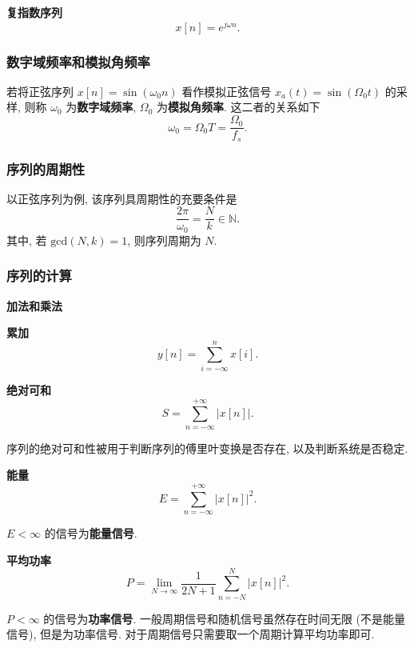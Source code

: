 \textbf{复指数序列}
\begin{equation}
    x[n]=e^{j\omega n}.
\end{equation}

\subsubsection{数字域频率和模拟角频率}
若将正弦序列 $x[n]=\sin(\omega_0 n)$ 看作模拟正弦信号 $x_a(t)=\sin(\Omega_0 t)$ 的采样, 则称 $\omega_0$ 为\textbf{数字域频率}, $\Omega_0$ 为\textbf{模拟角频率}. 这二者的关系如下
\begin{equation}
    \omega_0=\Omega_0T=\frac{\Omega_0}{f_s}.
\end{equation}

\subsubsection{序列的周期性}
以正弦序列为例, 该序列具周期性的充要条件是
\begin{equation}
    \frac{2\pi}{\omega_0}=\frac{N}{k}\in\mathbb{N}.
\end{equation}
其中, 若 $\mathrm{gcd}(N,k)=1$, 则序列周期为 $N$.

\subsubsection{序列的计算}
\textbf{加法和乘法}

\textbf{累加}
\begin{equation}
    y[n]=\sum_{i=-\infty}^{n}x[i].
\end{equation}

\textbf{绝对可和}
\begin{equation}
    S=\sum_{n=-\infty}^{+\infty}|x[n]|.
\end{equation}

序列的绝对可和性被用于判断序列的傅里叶变换是否存在, 以及判断系统是否稳定.

\textbf{能量}
\begin{equation}
    E=\sum_{n=-\infty}^{+\infty}|x[n]|^2.
\end{equation}

$E<\infty$ 的信号为\textbf{能量信号}.

\textbf{平均功率}
\begin{equation}
    P=\lim_{N\rightarrow\infty}\frac{1}{2N+1}\sum_{n=-N}^{N}|x[n]|^2.
\end{equation}

$P<\infty$ 的信号为\textbf{功率信号}. 一般周期信号和随机信号虽然存在时间无限 (不是能量信号), 但是为功率信号. 对于周期信号只需要取一个周期计算平均功率即可.

